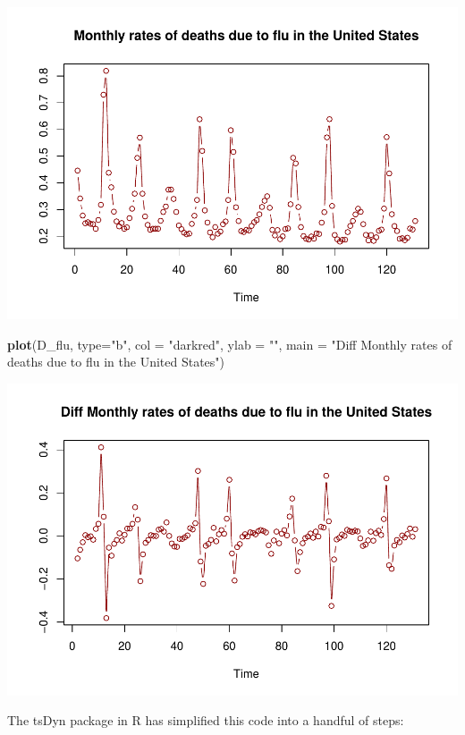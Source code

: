 \documentclass[
]{book}
\newenvironment{Shaded}{\begin{snugshade}}{\end{snugshade}}
\newcommand{\AttributeTok}[1]{\textcolor[rgb]{0.13,0.29,0.53}{#1}}
\newcommand{\FunctionTok}[1]{\textcolor[rgb]{0.13,0.29,0.53}{\textbf{#1}}}
\newcommand{\NormalTok}[1]{#1}
\newcommand{\StringTok}[1]{\textcolor[rgb]{0.31,0.60,0.02}{#1}}
\begin{document}
\includegraphics{Notas-Series-Tiempo_files/figure-latex/unnamed-chunk-64-1.pdf}

\begin{Shaded}
\begin{Highlighting}[]
\FunctionTok{plot}\NormalTok{(D\_flu, }\AttributeTok{type=}\StringTok{"b"}\NormalTok{, }\AttributeTok{col =} \StringTok{"darkred"}\NormalTok{, }\AttributeTok{ylab =} \StringTok{""}\NormalTok{, }
     \AttributeTok{main =} \StringTok{"Diff Monthly rates of deaths due to flu in the United States"}\NormalTok{)}
\end{Highlighting}
\end{Shaded}

\includegraphics{Notas-Series-Tiempo_files/figure-latex/unnamed-chunk-64-2.pdf}

The tsDyn package in R has simplified this code into a handful of steps:
\end{document}
